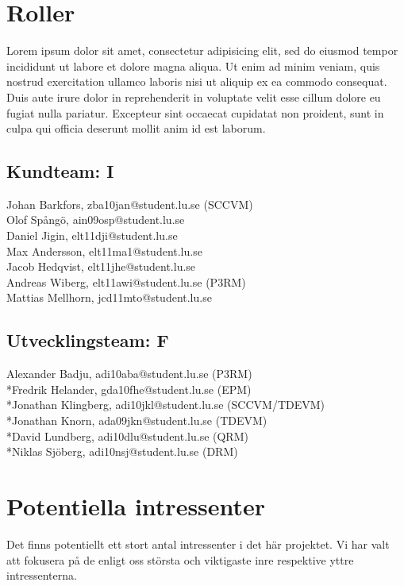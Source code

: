 \documentclass[10pt]{article}
\begin{document}
\section{Roller}
\sloppy
\noindent Lorem ipsum dolor sit amet, consectetur adipisicing elit, sed do eiusmod tempor incididunt ut labore et dolore magna aliqua. Ut enim ad minim veniam, quis nostrud exercitation ullamco laboris nisi ut aliquip ex ea commodo consequat. Duis aute irure dolor in reprehenderit in voluptate velit esse cillum dolore eu fugiat nulla pariatur. Excepteur sint occaecat cupidatat non proident, sunt in culpa qui officia deserunt mollit anim id est laborum.

\subsection{Kundteam: I}
\noindent
Johan Barkfors, zba10jan@student.lu.se (SCCVM)
\\Olof Spångö, ain09osp@student.lu.se
\\Daniel Jigin, elt11dji@student.lu.se
\\Max Andersson, elt11ma1@student.lu.se
\\Jacob Hedqvist, elt11jhe@student.lu.se
\\Andreas Wiberg, elt11awi@student.lu.se (P3RM)
\\Mattias Mellhorn, jcd11mto@student.lu.se


\subsection{Utvecklingsteam: F}
\noindent
Alexander Badju, adi10aba@student.lu.se (P3RM)	
\\*Fredrik Helander, gda10fhe@student.lu.se (EPM)
\\*Jonathan Klingberg, adi10jkl@student.lu.se (SCCVM/TDEVM)
\\*Jonathan Knorn, ada09jkn@student.lu.se (TDEVM)
\\*David Lundberg, adi10dlu@student.lu.se (QRM)
\\*Niklas Sjöberg, adi10nsj@student.lu.se (DRM)

\section{Potentiella intressenter}
\sloppy
\noindent
Det finns potentiellt ett stort antal intressenter i det här projektet. Vi har valt att fokusera på de enligt oss största och viktigaste inre respektive yttre intressenterna.
\end{document}
